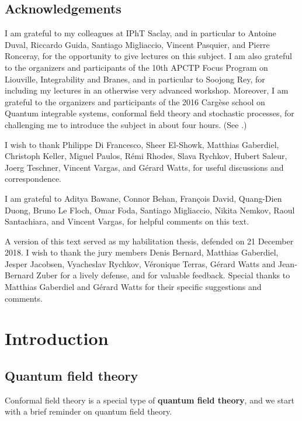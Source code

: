 \documentclass[12pt, a4paper, notitlepage, twoside]{report}
\numberwithin{equation}{section}
\theoremstyle{break}
\begin{document}
\section{Acknowledgements}

I am grateful to my colleagues at IPhT Saclay, and in particular to Antoine Duval, Riccardo Guida, Santiago Migliaccio, Vincent Pasquier, and Pierre Ronceray, for the opportunity to give lectures on this subject. I am also grateful to the organizers and participants of the 10th APCTP Focus Program on Liouville, Integrability and Branes, and in particular to Soojong Rey, for including my lectures in an otherwise very advanced workshop. Moreover, I am grateful to the organizers and participants of the 2016 Carg\`ese school on Quantum integrable systems, conformal field theory and stochastic processes, for challenging me to introduce the subject in about four hours. (See \cite{rib16}.) 

I wish to thank Philippe Di Francesco, Sheer El-Showk, Matthias Gaberdiel, Christoph Keller, Miguel Paulos, R\'emi Rhodes, Slava Rychkov, Hubert Saleur, Joerg Teschner, Vincent Vargas, and G\'erard Watts, for useful discussions and correspondence.

I am grateful to Aditya Bawane, Connor Behan, Fran\c{c}ois David, Quang-Dien Duong, Bruno Le Floch, Omar Foda, Santiago Migliaccio, Nikita Nemkov, Raoul Santachiara, and Vincent Vargas, for helpful comments on this text.

A version of this text served as my habilitation thesis, defended on 21 December 2018. I wish to thank the jury members Denis Bernard, Matthias Gaberdiel, Jesper Jacobsen, Vyacheslav Rychkov, V\'eronique Terras, G\'erard Watts and Jean-Bernard Zuber for a lively defense, and for valuable feedback. Special thanks to Matthias Gaberdiel and G\'erard Watts for their specific suggestions and comments.


\chapter{Introduction \label{secintr}}

\section{Quantum field theory \label{secqft} }

Conformal field theory is a special type of \textbf{\boldmath quantum field theory}, and we start with a brief reminder on quantum field theory.
\end{document}
